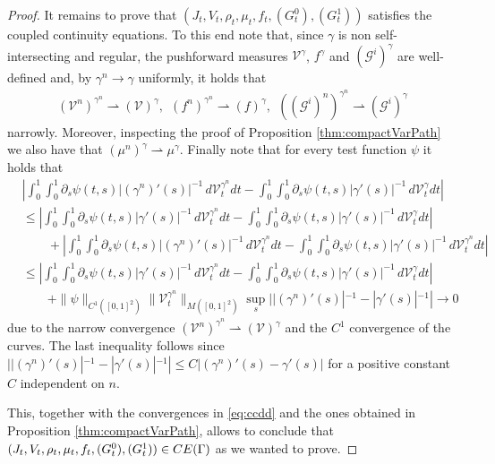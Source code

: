\documentclass[10pt,a4paper]{amsart}
\begin{document}
\begin{proof}
    It remains to prove that $(J_t, V_t, \rho_t, \mu_t, f_t, ({G_t^0}), ({G_t^1}))$ satisfies the coupled continuity equations. To this end note that, since $\gamma$ is non self-intersecting and regular, the pushforward measures $\mathcal{V}^\gamma$, $f^\gamma$ and $({\mathcal{G}^i})^\gamma$ are well-defined and, by $\gamma^n \rightarrow \gamma$ uniformly, it holds that 
    \begin{align}\label{eq:ccdd}
        (\mathcal{V}^n)^{\gamma^n} \rightharpoonup (\mathcal{V})^{\gamma}, \ \ (f^n)^{\gamma^n} \rightharpoonup (f)^{\gamma}, \ \ ((\mathcal{G}^i)^n)^{\gamma^n} \rightharpoonup ({\mathcal{G}^i})^{\gamma}
    \end{align}
    narrowly. Moreover, inspecting the proof of Proposition \ref{thm:compactVarPath} we also have that $(\mu^n)^\gamma \rightharpoonup \mu^\gamma$. Finally note that for every test function $\psi$ it holds that 
    \begin{align*}
        & \left|\int_0^1\int_0^1 \partial_s \psi(t,s) |(\gamma^n)'(s)|^{-1} \, d\mathcal{V}_t^{\gamma^n} dt - \int_0^1\int_0^1 \partial_s \psi(t,s) |\gamma'(s)|^{-1} \, d\mathcal{V}_t^{\gamma} dt \right| \\
        & \leq \left|\int_0^1\int_0^1 \partial_s \psi(t,s) |\gamma'(s)|^{-1} \, d\mathcal{V}_t^{\gamma^n} dt - \int_0^1\int_0^1 \partial_s \psi(t,s) |\gamma'(s)|^{-1} \, d\mathcal{V}_t^{\gamma} dt \right| \\
        & \qquad  + \left|\int_0^1\int_0^1 \partial_s \psi(t,s) |(\gamma^n)'(s)|^{-1} \, d\mathcal{V}_t^{\gamma^n} dt - \int_0^1\int_0^1 \partial_s \psi(t,s) |\gamma'(s)|^{-1} \, d\mathcal{V}_t^{\gamma^n} dt \right|\\
        & \leq \left|\int_0^1\int_0^1 \partial_s \psi(t,s) |\gamma'(s)|^{-1} \, d\mathcal{V}_t^{\gamma^n} dt - \int_0^1\int_0^1 \partial_s \psi(t,s) |\gamma'(s)|^{-1} \, d\mathcal{V}_t^{\gamma} dt \right| \\ 
        & \qquad + \|\psi\|_{C^1([0,1]^2)} \|\mathcal{V}^{\gamma^n}_t\|_{M([0,1]^2)} \sup_s ||(\gamma^n)'(s)|^{-1} - |\gamma'(s)|^{-1}| \rightarrow 0
    \end{align*}
    due to the narrow convergence $(\mathcal{V}^n)^{\gamma^n} \rightharpoonup (\mathcal{V})^{\gamma}$ and the $C^1$ convergence of the curves. The last inequality follows since  $||(\gamma^n)'(s)|^{-1} - |\gamma'(s)|^{-1}| \leq C|(\gamma^n)'(s) - \gamma'(s)|$ for a positive constant $C$ independent on $n$.

    This, together with the convergences in \eqref{eq:ccdd} and the ones obtained in Proposition \ref{thm:compactVarPath}, allows to conclude that $(J_t, V_t, \rho_t, \mu_t, f_t, ({G_t^0}), ({G_t^1})) \in {\rm CE}(\Gamma)$ as we wanted to prove. 
\end{proof}
\end{document}
